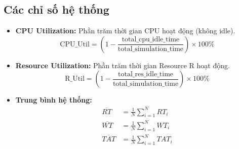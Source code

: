 \subsection{Các chỉ số hệ thống}

\begin{itemize}
    \item \textbf{CPU Utilization:} Phần trăm thời gian CPU hoạt động (không idle).
    \begin{equation}
        \text{CPU\_Util} = \left(1 - \frac{\text{total\_cpu\_idle\_time}}{\text{total\_simulation\_time}}\right) \times 100\%
    \end{equation}
    
    \item \textbf{Resource Utilization:} Phần trăm thời gian Resource R hoạt động.
    \begin{equation}
        \text{R\_Util} = \left(1 - \frac{\text{total\_res\_idle\_time}}{\text{total\_simulation\_time}}\right) \times 100\%
    \end{equation}
    
    \item \textbf{Trung bình hệ thống:}
    \begin{align}
        \overline{RT} &= \frac{1}{N} \sum_{i=1}^{N} RT_i \\
        \overline{WT} &= \frac{1}{N} \sum_{i=1}^{N} WT_i \\
        \overline{TAT} &= \frac{1}{N} \sum_{i=1}^{N} TAT_i
    \end{align}
\end{itemize}
